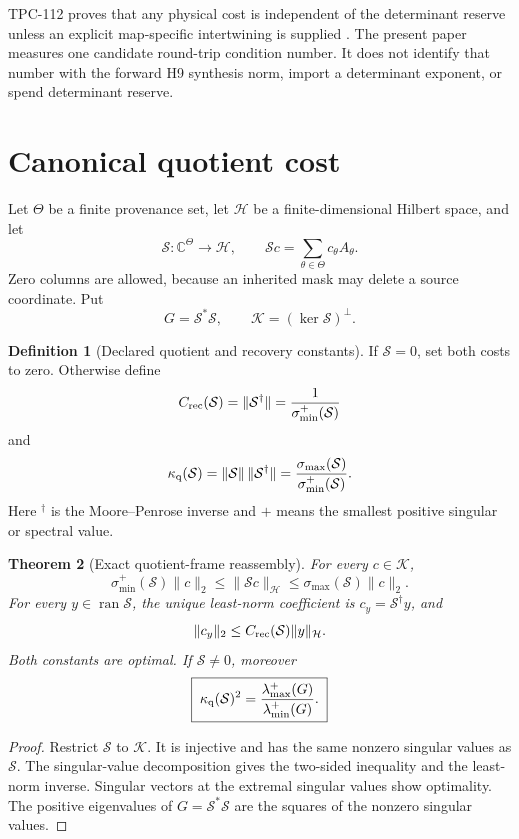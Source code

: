 \documentclass[11pt]{article}
\newtheorem{theorem}{Theorem}[section]
\theoremstyle{definition}
\newtheorem{definition}[theorem]{Definition}
\theoremstyle{remark}
\newcommand{\C}{\mathbb C}
\newcommand{\Syn}{\mathcal S}
\begin{document}
TPC-112 proves that any physical cost is independent of the
determinant reserve unless an explicit map-specific intertwining is
supplied \citep{WangTPC112}.  The present paper measures one candidate
round-trip condition number.  It does not identify that number with
the forward H9 synthesis norm, import a determinant exponent, or
spend determinant reserve.

\section{Canonical quotient cost}

Let \(\Theta\) be a finite provenance set, let \(\mathcal H\) be a
finite-dimensional Hilbert space, and let
\[
 \Syn:\C^\Theta\to\mathcal H,\qquad
 \Syn c=\sum_{\theta\in\Theta}c_\theta A_\theta .
\]
Zero columns are allowed, because an inherited mask may delete a
source coordinate.  Put
\[
 G=\Syn^*\Syn,\qquad
 \mathcal K=(\ker\Syn)^\perp.
\]

\begin{definition}[Declared quotient and recovery constants]
If \(\Syn=0\), set both costs to zero.  Otherwise define
\[
 C_{\rm rec}(\Syn)=\|\Syn^\dagger\|
 =\frac1{\sigma_{\min}^{+}(\Syn)}
\]
and
\[
 \kappa_{\rm q}(\Syn)
 =\|\Syn\|\,\|\Syn^\dagger\|
 =\frac{\sigma_{\max}(\Syn)}
        {\sigma_{\min}^{+}(\Syn)}.
\]
Here \(^{\dagger}\) is the Moore--Penrose inverse and \(+\) means the
smallest positive singular or spectral value.
\end{definition}

\begin{theorem}[Exact quotient-frame reassembly]
\label{thm:quotient}
For every \(c\in\mathcal K\),
\[
 \sigma_{\min}^{+}(\Syn)\|c\|_2
 \le\|\Syn c\|_{\mathcal H}
 \le\sigma_{\max}(\Syn)\|c\|_2.
\]
For every \(y\in\operatorname{ran}\Syn\), the unique least-norm
coefficient is \(c_y=\Syn^\dagger y\), and
\[
 \|c_y\|_2\le C_{\rm rec}(\Syn)\|y\|_{\mathcal H}.
\]
Both constants are optimal.  If \(\Syn\ne0\), moreover
\[
 \boxed{\;
 \kappa_{\rm q}(\Syn)^2
 =
 \frac{\lambda_{\max}^{+}(G)}
      {\lambda_{\min}^{+}(G)} .\;}
\]
\end{theorem}

\begin{proof}
Restrict \(\Syn\) to \(\mathcal K\).  It is injective and has the same
nonzero singular values as \(\Syn\).  The singular-value
decomposition gives the two-sided inequality and the least-norm
inverse.  Singular vectors at the extremal singular values show
optimality.  The positive eigenvalues of \(G=\Syn^*\Syn\) are the
squares of the nonzero singular values.
\end{proof}
\end{document}
